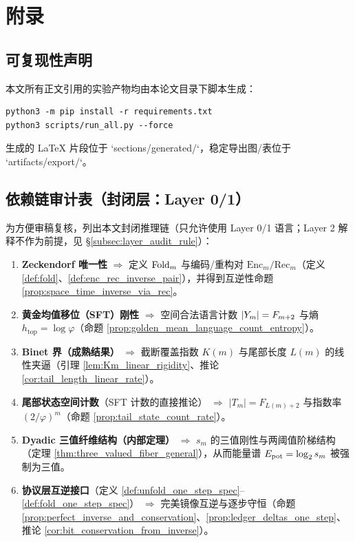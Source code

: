 \section{附录}

\subsection{可复现性声明}
本文所有正文引用的实验产物均由本论文目录下脚本生成：
\begin{verbatim}
python3 -m pip install -r requirements.txt
python3 scripts/run_all.py --force
\end{verbatim}
生成的 LaTeX 片段位于 `sections/generated/`，稳定导出图/表位于 `artifacts/export/`。

\subsection{依赖链审计表（封闭层：Layer 0/1）}\label{app:dependency_chain}
为方便审稿复核，列出本文封闭推理链（只允许使用 Layer 0/1 语言；Layer 2 解释不作为前提，见 \S\ref{subsec:layer_audit_rule}）：
\begin{enumerate}
  \item \textbf{Zeckendorf 唯一性} \cite{Zeckendorf1972,AlloucheShallit2003,Lothaire2002}
  \(\Rightarrow\) 定义 \(\mathrm{Fold}_m\) 与编码/重构对 \(\mathrm{Enc}_m/\mathrm{Rec}_m\)（定义 \ref{def:fold}、\ref{def:enc_rec_inverse_pair}），并得到互逆性命题 \ref{prop:space_time_inverse_via_rec}。
  \item \textbf{黄金均值移位（SFT）刚性} \cite{LindMarcus1995,Koshy2001}
  \(\Rightarrow\) 空间合法语言计数 \(|Y_m|=F_{m+2}\) 与熵 \(h_{\mathrm{top}}=\log\varphi\)（命题 \ref{prop:golden_mean_language_count_entropy}）。
  \item \textbf{Binet 界（成熟结果）} \cite{Koshy2001}
  \(\Rightarrow\) 截断覆盖指数 \(K(m)\) 与尾部长度 \(L(m)\) 的线性夹逼（引理 \ref{lem:Km_linear_rigidity}、推论 \ref{cor:tail_length_linear_rate}）。
  \item \textbf{尾部状态空间计数}（SFT 计数的直接推论）
  \(\Rightarrow\) \(|T_m|=F_{L(m)+2}\) 与指数率 \((2/\varphi)^m\)（命题 \ref{prop:tail_state_count_rate}）。
  \item \textbf{Dyadic 三值纤维结构（内部定理）} \cite{Internal2026DyadicZeckendorfWindowFoldingKernel}
  \(\Rightarrow\) \(s_m\) 的三值刚性与两阈值阶梯结构（定理 \ref{thm:three_valued_fiber_general}），从而能量谱 \(E_{\mathrm{pot}}=\log_2 s_m\) 被强制为三值。
  \item \textbf{协议层互逆接口}（定义 \ref{def:unfold_one_step_spec}--\ref{def:fold_one_step_spec}）
  \(\Rightarrow\) 完美镜像互逆与逐步守恒（命题 \ref{prop:perfect_inverse_and_conservation}、\ref{prop:ledger_deltas_one_step}、推论 \ref{cor:bit_conservation_from_inverse}）。
\end{enumerate}

